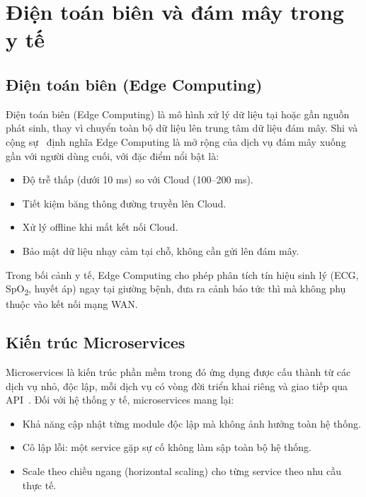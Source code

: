 \section{Điện toán biên và đám mây trong y tế}

\subsection{Điện toán biên (Edge Computing)}

Điện toán biên (Edge Computing) là mô hình xử lý dữ liệu tại hoặc gần nguồn phát sinh, thay vì chuyển toàn bộ dữ liệu lên trung tâm dữ liệu đám mây. Shi và cộng sự~\cite{shi2016edge} định nghĩa Edge Computing là mở rộng của dịch vụ đám mây xuống gần với người dùng cuối, với đặc điểm nổi bật là:

\begin{itemize}
    \item Độ trễ thấp (dưới 10 ms) so với Cloud (100–200 ms).
    \item Tiết kiệm băng thông đường truyền lên Cloud.
    \item Xử lý offline khi mất kết nối Cloud.
    \item Bảo mật dữ liệu nhạy cảm tại chỗ, không cần gửi lên đám mây.
\end{itemize}

Trong bối cảnh y tế, Edge Computing cho phép phân tích tín hiệu sinh lý (ECG, SpO\textsubscript{2}, huyết áp) ngay tại giường bệnh, đưa ra cảnh báo tức thì mà không phụ thuộc vào kết nối mạng WAN.

\subsection{Kiến trúc Microservices}

Microservices là kiến trúc phần mềm trong đó ứng dụng được cấu thành từ các dịch vụ nhỏ, độc lập, mỗi dịch vụ có vòng đời triển khai riêng và giao tiếp qua API~\cite{newman2015microservices}. Đối với hệ thống y tế, microservices mang lại:

\begin{itemize}
    \item Khả năng cập nhật từng module độc lập mà không ảnh hưởng toàn hệ thống.
    \item Cô lập lỗi: một service gặp sự cố không làm sập toàn bộ hệ thống.
    \item Scale theo chiều ngang (horizontal scaling) cho từng service theo nhu cầu thực tế.
\end{itemize}

